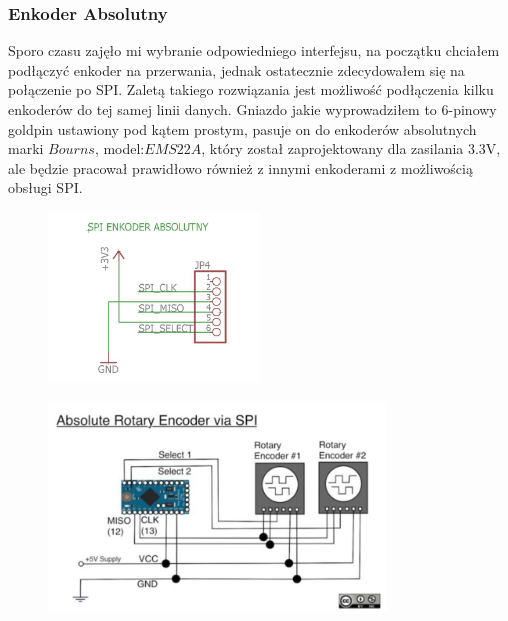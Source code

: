 \documentclass[12pt]{article}
\begin{document}
\subsubsection{Enkoder Absolutny}
Sporo czasu zajęło mi wybranie odpowiedniego interfejsu, na początku chciałem podłączyć enkoder na przerwania, jednak ostatecznie zdecydowałem się na połączenie po SPI. Zaletą takiego rozwiązania jest możliwość podłączenia kilku enkoderów do tej samej linii danych. Gniazdo jakie wyprowadziłem to 6-pinowy goldpin ustawiony pod kątem prostym, pasuje on do enkoderów absolutnych marki $Bourns$, model:$EMS22A$, który został zaprojektowany dla zasilania 3.3V, ale będzie pracował prawidłowo również z innymi enkoderami z możliwością obsługi SPI.
\begin{figure}[H]
\begin{center}
\includegraphics[width=0.5\textwidth]{figures/schemat5.jpg}
\end{center}
\end{figure}
\begin{figure}[H]
\begin{center}
\includegraphics[width=0.8\textwidth]{figures/SPI.jpg}
\end{center}
\end{figure}
\newpage
\end{document}
